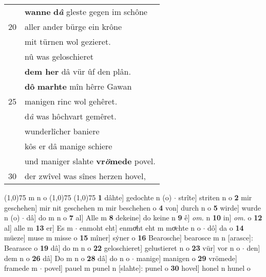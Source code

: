 \documentclass[8pt,a4paper,notitlepage]{article}
\begin{document}
\begin{table}[ht]
\begin{minipage}[t]{0.5\linewidth}
\begin{tabular}{rl}
 & \textbf{wanne} \textbf{d\textit{â}} gleste gegen im schône\\ 
20 & aller ander bürge ein krône\\ 
 & mit türnen wol gezieret.\\ 
 & nû was geloschieret\\ 
 & \textbf{dem her} dâ vür ûf den plân.\\ 
 & \textbf{dô} \textbf{marhte} mîn hêrre Gawan\\ 
25 & manigen rinc wol gehêret.\\ 
 & d\textit{â} was hôchvart gemêret.\\ 
 & wunderlîcher baniere\\ 
 & kôs er dâ manige schiere\\ 
 & und maniger slahte \textbf{vr\textit{ö}mede} povel.\\ 
30 & der zwîvel was sînes herzen hovel,\\ 
\end{tabular}
\scriptsize
\line(1,0){75} \newline
m n o \newline
\line(1,0){75} \newline
\newline
\line(1,0){75} \newline
\textbf{1} dâhte] gedochte n (o)  $\cdot$ strîte] striten n o \textbf{2} mir geschehen] mir nit geschehen m mir beschehen o \textbf{4} von] durch n o \textbf{5} wirde] wurde n (o)  $\cdot$ dâ] do m n o \textbf{7} al] Alle m \textbf{8} dekeine] do keine n \textbf{9} ê] \textit{om.} n \textbf{10} in] \textit{om.} o \textbf{12} al] alle m \textbf{13} er] Es m  $\cdot$ enmoht eht] enmoͯht eht m moͯchte n o  $\cdot$ dô] da o \textbf{14} müeze] muse m misse o \textbf{15} mîner] sẏner o \textbf{16} Bearosche] bearosce m n [arasce]: Bearasce o \textbf{19} dâ] do m n o \textbf{22} geloschieret] gelustieret n o \textbf{23} vür] vor n o  $\cdot$ den] dem n o \textbf{26} dâ] Do m n o \textbf{28} dâ] do n o  $\cdot$ manige] manigen o \textbf{29} vrömede] framede m  $\cdot$ povel] pauel m punel n [slahte]: punel o \textbf{30} hovel] honel n hunel o \newline
\end{minipage}
\end{table}
\newpage
\end{document}
